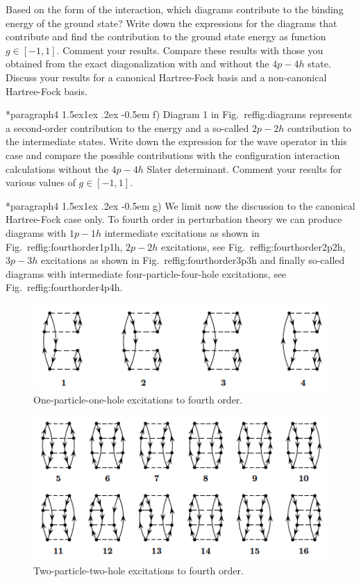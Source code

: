 \documentclass[%
twoside,                 %
final,                   %
10pt]{article}
\makeatletter
\newenvironment{doconceexercise}{}{}
\newcommand\subex{\@startsection*{paragraph}{4}{\z@}%
                  {1.5ex\@plus1ex \@minus.2ex}%
                  {-0.5em}%
                  {\normalfont\normalsize\bfseries}}
\makeatother
\begin{document}
\begin{doconceexercise}
Based on the form of the interaction, which diagrams contribute to the
binding energy of the ground state?  Write down the expressions for
the diagrams that contribute and find the contribution to the ground
state energy as function $g\in [-1,1]$. Comment your results.  Compare
these results with those you obtained from the exact diagonalization with and without the $4p-4h$ state.
Discuss your results for a canonical Hartree-Fock basis and a non-canonical Hartree-Fock basis.

\subex{f)}
Diagram 1 in Fig.~ref{fig:diagrams} represents a second-order contribution to the energy and a so-called $2p-2h$ contribution to the intermediate states. Write down the expression for the wave operator in this case and compare the possible contributions with the configuration interaction calculations without the $4p-4h$ Slater determinant. Comment your results for 
various values of $g\in [-1,1]$.

\subex{g)}
We limit now the discussion to the canonical Hartree-Fock case only. To fourth order in perturbation theory we can produce diagrams with $1p-1h$ intermediate excitations as shown in Fig.~ref{fig:fourthorder1p1h}, $2p-2h$ excitations, see Fig.~ref{fig:fourthorder2p2h}, $3p-3h$ excitations as shown in Fig.~ref{fig:fourthorder3p3h} and finally so-called diagrams with intermediate four-particle-four-hole excitations, see Fig.~ref{fig:fourthorder4p4h}. 


\begin{figure}[t]
  \centerline{\includegraphics[width=0.6\linewidth]{fig-proj/fourthorder1p1h.png}}
  \caption{
  One-particle-one-hole excitations to fourth order. \label{fig:fourthorder1p1h}
  }
\end{figure}



\begin{figure}[t]
  \centerline{\includegraphics[width=0.6\linewidth]{fig-proj/fourthorder2p2h.png}}
  \caption{
  Two-particle-two-hole excitations to fourth order. \label{fig:fourthorder2p2h}
  }
\end{figure}




\end{doconceexercise}
\end{document}
